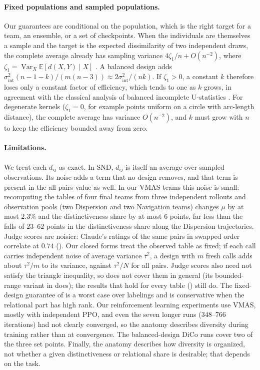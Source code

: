 \documentclass[twoside,11pt]{article}
\newcommand{\E}{\mathbb{E}}
\DeclareMathOperator{\Var}{Var}
\newcommand{\sigmaint}{\sigma^2_{\mathrm{int}}}
\begin{document}
\paragraph{Fixed populations and sampled populations.}
Our guarantees are conditional on the population, which is the right target
for a team, an ensemble, or a set of checkpoints. When the individuals are
themselves a sample and the target is the expected dissimilarity of two
independent draws, the complete average already has sampling variance
$4\zeta_1/n+O(n^{-2})$, where $\zeta_1=\Var_X\E[d(X,Y)\mid X]$
\citep{hoeffding1948class}. A balanced design adds
\mbox{$\sigmaint(n-1-k)/(m(n-3))\approx2\sigmaint/(nk)$}. If $\zeta_1>0$, a constant
$k$ therefore loses only a constant factor of efficiency, which tends to
one as $k$ grows, in agreement with the classical analysis of balanced
incomplete U-statistics \citep{blom1976some,brown1978reduced,lee1990ustatistics}.
For degenerate kernels ($\zeta_1=0$, for example points uniform on a circle
with arc-length distance), the complete average has variance $O(n^{-2})$, and
$k$ must grow with $n$ to keep the efficiency bounded away from zero.

\paragraph{Limitations.}
We treat each $d_{ij}$ as exact. In SND, $d_{ij}$ is itself an average over
sampled observations. Its noise adds a term that no design removes, and that
term is present in the all-pairs value as well. In our VMAS teams this noise
is small: recomputing the tables of four final teams from three independent
rollouts and observation pools (two Dispersion and two Navigation teams)
changes $\mu$ by at most
$2.3\%$ and the distinctiveness share by at most $6$ points, far less than the falls of $23$--$62$ points
in the distinctiveness share along the Dispersion trajectories. Judge
scores are noisier: Claude's ratings of the same pairs in swapped order
correlate at $0.74$ (). Our closed forms treat
the observed table as fixed; if each call carries independent noise of
average variance $\bar\tau^2$, a design with $m$ fresh calls adds about
$\bar\tau^2/m$ to its variance, against $\bar\tau^2/N$ for all pairs. Judge scores also need not satisfy the triangle
inequality, so  does not cover them in general (its
bounded-range variant in  does); the results that hold
for every table
()
still do. The fixed-design guarantee
of  is a worst case over labelings and is
conservative when the relational part has high rank. Our reinforcement
learning experiments use VMAS, mostly with independent PPO, and even the
seven longer runs ($348$--$766$ iterations) had not clearly converged, so the
anatomy describes diversity during training rather than at convergence. The balanced-design DiCo runs
cover two of the three set points. Finally, the anatomy describes how diversity is
organized, not whether a given distinctiveness or relational share is desirable;
that depends on the task.
\end{document}
